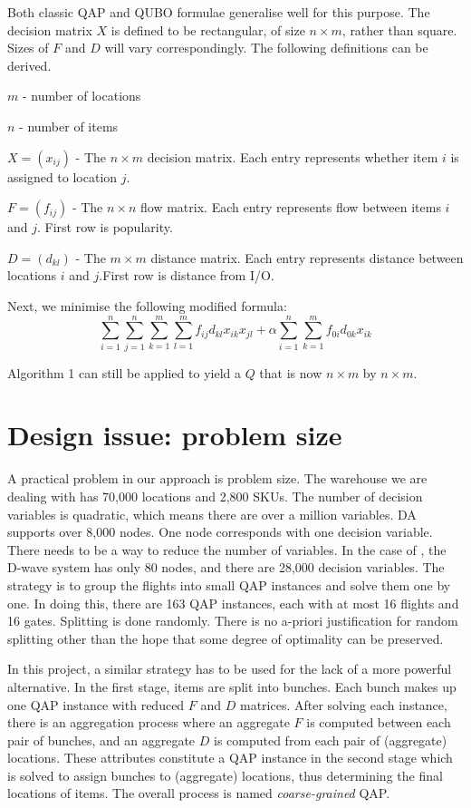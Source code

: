 \documentclass[hyp]{socreport}
\begin{document}
Both classic QAP and QUBO formulae generalise well for this purpose. The decision matrix $X$ is defined to be rectangular, of size $n \times m$, rather than square. Sizes of $F$ and $D$ will vary correspondingly. The following definitions can be derived.

$m$ - number of locations

$n$ - number of items

$X = (x_{ij})$ - The $n \times m$ decision matrix. Each entry represents whether item $i$ is assigned to location $j$. 

$F = (f_{ij})$ - The $n \times n$ flow matrix. Each entry represents flow between items $i$ and $j$. First row is popularity.

$D = (d_{kl})$ - The $m \times m$ distance matrix. Each entry represents distance between locations $i$ and $j$.First row is distance from I/O.

Next, we minimise the following modified formula:
\[\sum_{i=1}^{n}\sum_{j=1}^{n}\sum_{k=1}^{m}\sum_{l=1}^{m}f_{ij}d_{kl}x_{ik}x_{jl} + \alpha \sum_{i=1}^{n}\sum_{k=1}^{m}f_{0i}d_{0k}x_{ik}\]

Algorithm 1 can still be applied to yield a $Q$ that is now $n\times m$ by $n \times m$.

\section{Design issue: problem size}
\label{sec:coarse}
A practical problem in our approach is problem size. The warehouse we are dealing with has 70,000 locations and 2,800 SKUs. The number of decision variables is quadratic, which means there are over a million variables. DA supports over 8,000 nodes. One node corresponds with one decision variable. There needs to be a way to reduce the number of variables. In the case of \cite{Lobe:2019}, the D-wave system has only 80 nodes, and there are 28,000 decision variables. The strategy is to group the flights into small QAP instances and solve them one by one. In doing this, there are 163 QAP instances, each with at most 16 flights and 16 gates. Splitting is done randomly. There is no a-priori justification for random splitting other than the hope that some degree of optimality can be preserved.

In this project, a similar strategy has to be used for the lack of a more powerful alternative. In the first stage, items are split into bunches. Each bunch makes up one QAP instance with reduced $F$ and $D$ matrices. After solving each instance, there is an aggregation process where an aggregate $F$ is computed between each pair of bunches, and an aggregate $D$ is computed from each pair of (aggregate) locations. These attributes constitute a QAP instance in the second stage which is solved to assign bunches to (aggregate) locations, thus determining the final locations of items. The overall process is named \textit{coarse-grained} QAP.
\end{document}
